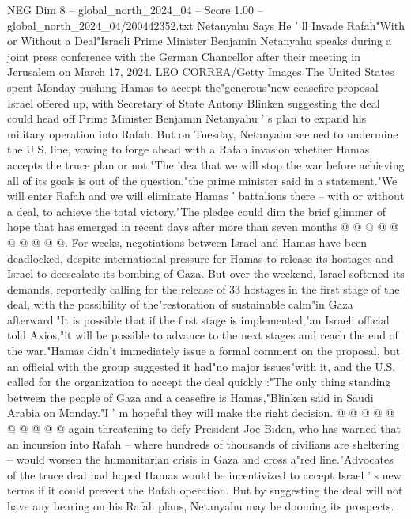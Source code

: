 \begin{textsample}{NEG Dim 8 – global\_north\_2024\_04 – Score 1.00 – global\_north\_2024\_04/200442352.txt}  \label{ex:f8_neg_407}
Netanyahu Says He ' ll Invade Rafah"With or Without a Deal"Israeli Prime Minister Benjamin Netanyahu speaks during a joint press conference with the German Chancellor after their meeting in Jerusalem on March 17, 2024.
LEO CORREA/Getty Images The United States spent Monday pushing Hamas to accept the"generous"new ceasefire proposal Israel offered up, with Secretary of State Antony Blinken suggesting the deal could head off Prime Minister Benjamin Netanyahu ' s plan to expand his military operation into Rafah.
But on Tuesday, Netanyahu seemed to undermine the U.S. line, vowing to forge ahead with a Rafah invasion whether Hamas accepts the truce plan or not."The idea that we will stop the war before achieving all of its goals is out of the question,"the prime minister said in a statement."We will enter Rafah and we will eliminate Hamas ' battalions there -- with or without a deal, to achieve the total victory."The pledge could dim the brief glimmer of hope that has emerged in recent days after more than seven months @ @ @ @ @ @ @ @ @ @.
For weeks, negotiations between Israel and Hamas have been deadlocked, despite international pressure for Hamas to release its hostages and Israel to deescalate its bombing of Gaza.
But over the weekend, Israel softened its demands, reportedly calling for the release of 33 hostages in the first stage of the deal, with the possibility of the"restoration of sustainable calm"in Gaza afterward."It is possible that if the first stage is implemented,"an Israeli official told Axios,"it will be possible to advance to the next stages and reach the end of the war."Hamas didn't immediately issue a formal comment on the proposal, but an official with the group suggested it had"no major issues"with it, and the U.S. called for the organization to accept the deal quickly :"The only thing standing between the people of Gaza and a ceasefire is Hamas,"Blinken said in Saudi Arabia on Monday."I ' m hopeful they will make the right decision. @ @ @ @ @ @ @ @ @ @ again threatening to defy President Joe Biden, who has warned that an incursion into Rafah -- where hundreds of thousands of civilians are sheltering -- would worsen the humanitarian crisis in Gaza and cross a"red line."Advocates of the truce deal had hoped Hamas would be incentivized to accept Israel ' s new terms if it could prevent the Rafah operation.
But by suggesting the deal will not have any bearing on his Rafah plans, Netanyahu may be dooming its prospects.

\end{textsample}

